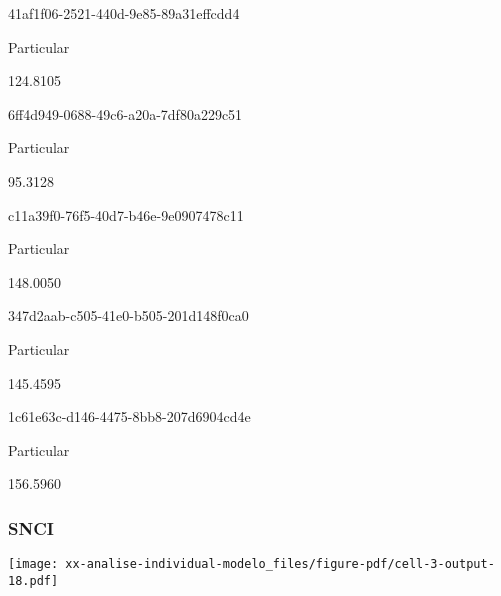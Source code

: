\documentclass[
  11pt,
  a4paper,
  DIV=11,
  numbers=noendperiod]{scrartcl}
\begin{document}
41af1f06-2521-440d-9e85-89a31effcdd4

\n      

Particular

\n      

124.8105

\n    

\n    

\n      

6ff4d949-0688-49c6-a20a-7df80a229c51

\n      

Particular

\n      

95.3128

\n    

\n    

\n      

c11a39f0-76f5-40d7-b46e-9e0907478c11

\n      

Particular

\n      

148.0050

\n    

\n    

\n      

347d2aab-c505-41e0-b505-201d148f0ca0

\n      

Particular

\n      

145.4595

\n    

\n    

\n      

1c61e63c-d146-4475-8bb8-207d6904cd4e

\n      

Particular

\n      

156.5960

\n    

\n  

\n

\subsubsection{SNCI}\label{snci}

\texttt{[image: xx-analise-individual-modelo\_files/figure-pdf/cell-3-output-18.pdf]}

\n  

\n    

\n      
\end{document}
